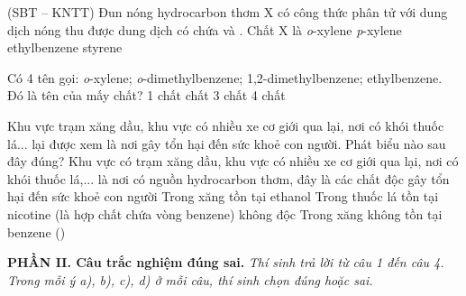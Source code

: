 \documentclass[12pt,a4paper]{article}
\begin{document}
\begin{ex}
(SBT -- KNTT) Đun nóng hydrocarbon thơm X có công thức phân tử  với dung dịch  nóng thu được dung dịch có chứa  và . Chất X là
\choice
{\textit{o}-xylene}
{\textit{p}-xylene}
{\True ethylbenzene}
{styrene}
\end{ex}

\begin{ex}
Có 4 tên gọi: \textit{o}-xylene; \textit{o}-dimethylbenzene; 1,2-dimethylbenzene; ethylbenzene. Đó là tên của mấy chất?
\choice
{1 chất}
{ chất}
{3 chất}
{4 chất}
\end{ex}

\begin{ex}
Khu vực trạm xăng dầu, khu vực có nhiều xe cơ giới qua lại, nơi có khói thuốc lá... lại được xem là nơi gây tổn hại đến sức khoẻ con người. Phát biểu nào sau đây đúng?
\choice
{\True Khu vực có trạm xăng dầu, khu vực có nhiều xe cơ giới qua lại, nơi có khói thuốc lá,... là nơi có nguồn hydrocarbon thơm, đây là các chất độc gây tổn hại đến sức khoẻ con người}
{Trong xăng tồn tại ethanol}
{Trong thuốc lá tồn tại nicotine (là hợp chất chứa vòng benzene) không độc}
{Trong xăng không tồn tại benzene ()}
\end{ex}


\bigskip
\noindent\textbf{\large PHẦN II. Câu trắc nghiệm đúng sai.}
\textit{Thí sinh trả lời từ câu 1 đến câu 4. Trong mỗi ý a), b), c), d) ở mỗi câu, thí sinh chọn đúng hoặc sai.}
\vspace{0.2cm}
\end{document}
